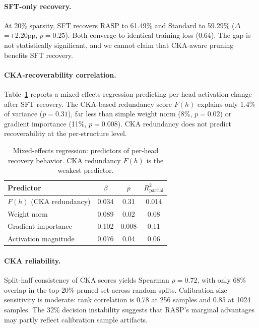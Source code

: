 \documentclass[11pt,a4paper]{article}
\begin{document}
\paragraph{SFT-only recovery.} At 20\% sparsity, SFT recovers RASP to 61.49\% and Standard to 59.29\% ($\Delta$=+2.20pp, $p=0.25$). Both converge to identical training loss (0.64). The gap is not statistically significant, and we cannot claim that CKA-aware pruning benefits SFT recovery.

\paragraph{CKA-recoverability correlation.} Table~\ref{tab:cka_regression} reports a mixed-effects regression predicting per-head activation change after SFT recovery. The CKA-based redundancy score $F(h)$ explains only 1.4\% of variance ($p=0.31$), far less than simple weight norm (8\%, $p=0.02$) or gradient importance (11\%, $p=0.008$). CKA redundancy does not predict recoverability at the per-structure level.

\begin{table}[t]
\centering
\small
\caption{Mixed-effects regression: predictors of per-head recovery behavior. CKA redundancy $F(h)$ is the weakest predictor.}
\label{tab:cka_regression}
\begin{tabular}{lccc}
\toprule
\textbf{Predictor} & $\beta$ & $p$ & $R^2_{\text{partial}}$ \\
\midrule
$F(h)$ (CKA redundancy) & 0.034 & 0.31 & 0.014 \\
Weight norm & 0.089 & 0.02 & 0.08 \\
Gradient importance & 0.102 & 0.008 & 0.11 \\
Activation magnitude & 0.076 & 0.04 & 0.06 \\
\bottomrule
\end{tabular}
\end{table}

\paragraph{CKA reliability.} Split-half consistency of CKA scores yields Spearman $\rho = 0.72$, with only 68\% overlap in the top-20\% pruned set across random splits. Calibration size sensitivity is moderate: rank correlation is 0.78 at 256 samples and 0.85 at 1024 samples. The 32\% decision instability suggests that RASP's marginal advantages may partly reflect calibration sample artifacts.
\end{document}
